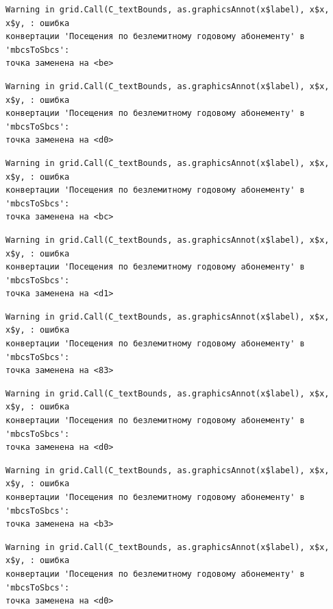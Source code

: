 \documentclass[
  letterpaper,
  DIV=11,
  numbers=noendperiod]{scrreprt}
\begin{document}
\begin{verbatim}
Warning in grid.Call(C_textBounds, as.graphicsAnnot(x$label), x$x, x$y, : ошибка
конвертации 'Посещения по безлемитному годовому абонементу' в 'mbcsToSbcs':
точка заменена на <be>
\end{verbatim}

\begin{verbatim}
Warning in grid.Call(C_textBounds, as.graphicsAnnot(x$label), x$x, x$y, : ошибка
конвертации 'Посещения по безлемитному годовому абонементу' в 'mbcsToSbcs':
точка заменена на <d0>
\end{verbatim}

\begin{verbatim}
Warning in grid.Call(C_textBounds, as.graphicsAnnot(x$label), x$x, x$y, : ошибка
конвертации 'Посещения по безлемитному годовому абонементу' в 'mbcsToSbcs':
точка заменена на <bc>
\end{verbatim}

\begin{verbatim}
Warning in grid.Call(C_textBounds, as.graphicsAnnot(x$label), x$x, x$y, : ошибка
конвертации 'Посещения по безлемитному годовому абонементу' в 'mbcsToSbcs':
точка заменена на <d1>
\end{verbatim}

\begin{verbatim}
Warning in grid.Call(C_textBounds, as.graphicsAnnot(x$label), x$x, x$y, : ошибка
конвертации 'Посещения по безлемитному годовому абонементу' в 'mbcsToSbcs':
точка заменена на <83>
\end{verbatim}

\begin{verbatim}
Warning in grid.Call(C_textBounds, as.graphicsAnnot(x$label), x$x, x$y, : ошибка
конвертации 'Посещения по безлемитному годовому абонементу' в 'mbcsToSbcs':
точка заменена на <d0>
\end{verbatim}

\begin{verbatim}
Warning in grid.Call(C_textBounds, as.graphicsAnnot(x$label), x$x, x$y, : ошибка
конвертации 'Посещения по безлемитному годовому абонементу' в 'mbcsToSbcs':
точка заменена на <b3>
\end{verbatim}

\begin{verbatim}
Warning in grid.Call(C_textBounds, as.graphicsAnnot(x$label), x$x, x$y, : ошибка
конвертации 'Посещения по безлемитному годовому абонементу' в 'mbcsToSbcs':
точка заменена на <d0>
\end{verbatim}
\end{document}
